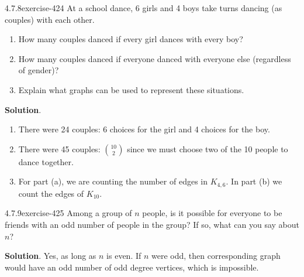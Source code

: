 \documentclass[twoside,11pt,]{book}
\numberwithin{equation}{chapter}
\begin{document}
\begin{divisionsolution}{4.7.8}{}{exercise-424}%
\hypertarget{p-4942}{}%
At a school dance, 6 girls and 4 boys take turns dancing (as couples) with each other.\leavevmode%
\begin{enumerate}[label=(\alph*)]
\item\hypertarget{li-2376}{}\hypertarget{p-4943}{}%
How many couples danced if every girl dances with every boy?%
\item\hypertarget{li-2377}{}\hypertarget{p-4944}{}%
How many couples danced if everyone danced with everyone else (regardless of gender)?%
\item\hypertarget{li-2378}{}\hypertarget{p-4945}{}%
Explain what graphs can be used to represent these situations.%
\end{enumerate}
%
\par\smallskip%
\noindent\textbf{Solution}.\quad%
\hypertarget{p-4946}{}%
\leavevmode%
\begin{enumerate}[label=(\alph*)]
\item\hypertarget{li-2379}{}\hypertarget{p-4947}{}%
There were 24 couples: 6 choices for the girl and 4 choices for the boy.%
\item\hypertarget{li-2380}{}\hypertarget{p-4948}{}%
There were 45 couples: \({10 \choose 2}\) since we must choose two of the 10 people to dance together.%
\item\hypertarget{li-2381}{}\hypertarget{p-4949}{}%
For part (a), we are counting the number of edges in \(K_{4,6}\). In part (b) we count the edges of \(K_{10}\).%
\end{enumerate}
%
\end{divisionsolution}%
\begin{divisionsolution}{4.7.9}{}{exercise-425}%
\hypertarget{p-4950}{}%
Among a group of \(n\) people, is it possible for everyone to be friends with an odd number of people in the group? If so, what can you say about \(n\)?%
\par\smallskip%
\noindent\textbf{Solution}.\quad%
\hypertarget{p-4951}{}%
Yes, as long as \(n\) is even. If \(n\) were odd, then corresponding graph would have an odd number of odd degree vertices, which is impossible.%
\end{divisionsolution}%
\end{document}
